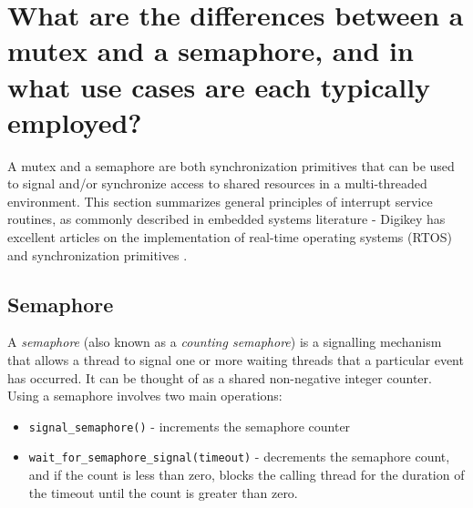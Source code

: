 \documentclass[main.tex]{subfiles}
\begin{document}
\section{What are the differences between a mutex and a semaphore, and in what use cases are each typically employed?}

\spoilerline
\noindent A mutex and a semaphore are both synchronization primitives that can be used to signal and/or synchronize access to shared resources in a multi-threaded environment. This section summarizes general principles of interrupt service routines, as commonly described in embedded systems literature - Digikey has excellent articles on the implementation of real-time operating systems (RTOS) and synchronization primitives \cite{digikey_rtos}.

\subsection{Semaphore}
A \textit{semaphore} (also known as a \textit{counting semaphore}) is a signalling mechanism that allows a thread to signal one or more waiting threads that a particular event has occurred. It can be thought of as a shared non-negative integer counter.
\newline
\newline
Using a semaphore involves two main operations: \begin{itemize}
    \item \texttt{signal\_semaphore()} - increments the semaphore counter
    \item \texttt{wait\_for\_semaphore\_signal(timeout)} - decrements the semaphore count, and if the count is less than zero, blocks the calling thread for the duration of the timeout until the count is greater than zero.
\end{itemize}
\end{document}
